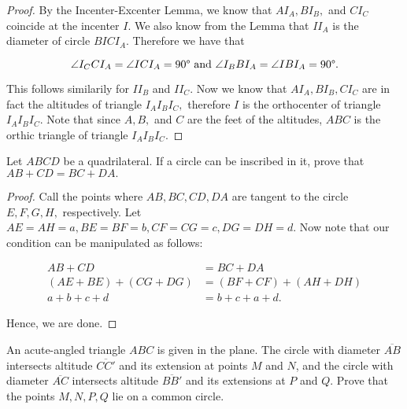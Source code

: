 \documentclass[letterpaper,oneside]{scrartcl}
\begin{document}
\begin{proof}  By the Incenter-Excenter Lemma, we know that $AI_A, BI_B,$ and $CI_C$ coincide at the incenter $I$. We also know from the Lemma that $II_A$ is the diameter of circle $BICI_A.$ Therefore we have that

  $$\angle {I_CCI_A} = \angle {ICI_A} =  90\degree \text{ and } \angle {I_BBI_A} = \angle {IBI_A} = 90\degree .$$

  This follows similarily for $II_B$ and $II_C.$ Now we know that $AI_A, BI_B, CI_C$ are in fact the altitudes of triangle $I_AI_BI_C,$ therefore $I$ is the orthocenter of triangle $I_AI_BI_C.$ Note that since $A,B,$ and $C$ are the feet of the altitudes, $ABC$ is the orthic triangle of triangle $I_AI_BI_C.$ \end{proof}

\begin{theorem*}
  Let $ABCD$ be a quadrilateral. If a circle can be inscribed in it, prove that $AB + CD = BC + DA.$
\end{theorem*}

\begin{proof}  Call the points where $AB, BC, CD, DA$ are tangent to the circle $E, F, G, H,$ respectively. Let $AE = AH = a, BE = BF = b, CF = CG = c, DG = DH = d.$ Now note that our condition can be manipulated as follows:

  \begin{align*}
    AB + CD               & = BC + DA               \\
    (AE + BE) + (CG + DG) & = (BF + CF) + (AH + DH) \\
    a + b + c + d         & = b + c + a + d.
  \end{align*}

  Hence, we are done.
\end{proof}

\begin{problem*}
  [2.26, USAMO 1990/5]
  An acute-angled triangle $ABC$ is given in the plane. The circle with diameter $\overline{AB}$ intersects altitude $\overline{CC'}$ and its extension at points $M$ and $N$, and the circle with diameter $\overline{AC}$ intersects altitude $\overline{BB'}$ and its extensions at $P$ and $Q$. Prove that the points $M, N, P , Q$ lie on a common circle.
\end{problem*}
\end{document}
